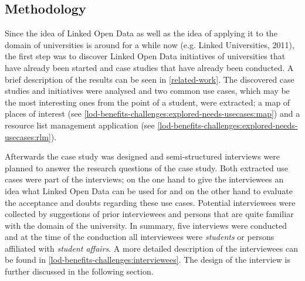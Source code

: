 \documentclass{article}
\begin{document}
\subsection{Methodology}
\label{lod-benefits-challenges:methodology}
Since the idea of Linked Open Data as well as the idea of applying it to the domain of universities is around for a while now (e.g. Linked Universities, 2011), the first step was to discover Linked Open Data initiatives of universities that have already been started and case studies that have already been conducted. A brief description of the results can be seen in \ref{related-work}. The discovered case studies and initiatives were analysed and two common use cases, which may be the most interesting ones from the point of a student, were extracted; a map of places of interest (see \ref{lod-benefits-challenges:explored-needs-usecases:map}) and a resource list management application (see \ref{lod-benefits-challenges:explored-needs-usecases:rlm}). 

Afterwards the case study was designed and semi-structured interviews were planned to answer the research questions of the case study. Both extracted use cases were part of the interviews; on the one hand to give the interviewees an idea what Linked Open Data can be used for and on the other hand to evaluate the acceptance and doubts regarding these use cases. Potential interviewees were collected by suggestions of prior interviewees and persons that are quite familiar with the domain of the university. In summary, five interviews were conducted and at the time of the conduction all interviewees were \textit{students} or persons affiliated with \textit{student affairs}. A more detailed description of the interviewees can be found in \ref{lod-benefits-challenges:interviewees}. The design of the interview is further discussed in the following section.
\end{document}
